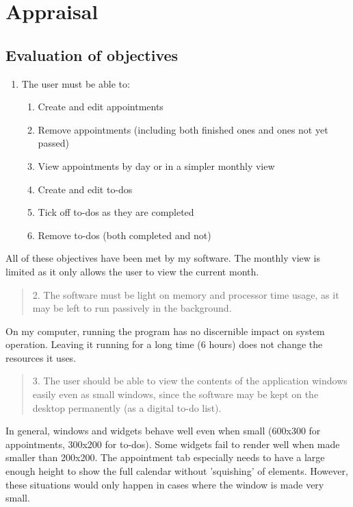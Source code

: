 \section{Appraisal}
\subsection{Evaluation of objectives}

\begin{enumerate}
    \item The user must be able to:
    \begin{enumerate}
        \item Create and edit appointments
        \item Remove appointments (including both finished ones and ones not yet
            passed)
        \item View appointments by day or in a simpler monthly view
        \item Create and edit to-dos
        \item Tick off to-dos as they are completed
        \item Remove to-dos (both completed and not)
    \end{enumerate}
\end{enumerate}

All of these objectives have been met by my software. The monthly view is
limited as it only allows the user to view the current month.

\begin{quotation}
2. The software must be light on memory and processor time usage, as it may be
left to run passively in the background.
\end{quotation}

On my computer, running the program has no discernible impact on system
operation. Leaving it running for a long time (6 hours) does not change the
resources it uses.

\begin{quotation}
3. The user should be able to view the contents of the application windows
easily even as small windows, since the software may be kept on the desktop
permanently (as a digital to-do list).
\end{quotation}

In general, windows and widgets behave well even when small (600x300 for
appointments, 300x200 for to-dos). Some widgets fail to render well when made
smaller than 200x200. The appointment tab especially needs to have a large
enough height to show the full calendar without 'squishing' of elements.
However, these situations would only happen in cases where the window is made
very small.

